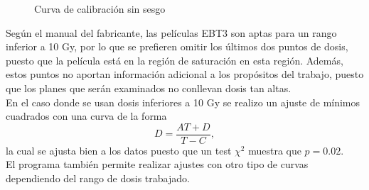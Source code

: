 \begin{figure}
	\centering
	
	\caption{Curva de calibración sin sesgo }
	\label{fig:curvaFinal}
\end{figure}

Según el manual del fabricante, las películas EBT3 son aptas para un rango inferior a 10 Gy, por lo que se prefieren omitir los últimos dos puntos de dosis, puesto que la película está en la región de saturación en esta región.  Además, estos puntos no aportan información adicional a los propósitos del trabajo, puesto que los planes que serán examinados no conllevan dosis tan altas.\\

En el caso donde se usan dosis inferiores a 10 Gy se realizo un ajuste de mínimos cuadrados con una curva de la forma
\begin{equation}
	D=\frac{AT+D}{T-C},
\end{equation}
la cual se ajusta bien a los datos puesto que un test $\chi^2$ muestra que $p=0.02$. \\

El programa también permite realizar ajustes con otro tipo de curvas dependiendo del rango de dosis trabajado.\\




